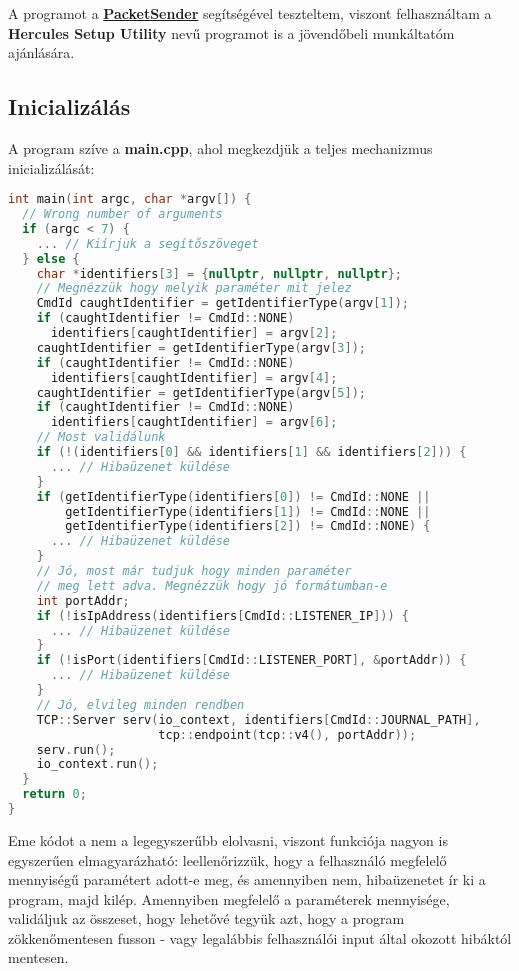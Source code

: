 \documentclass[openany,10pt,a4paper]{book}
\begin{document}
A programot a \href{https://packetsender.com/}{\textbf{PacketSender}} segítségével teszteltem, viszont felhasználtam a \textbf{Hercules Setup Utility} nevű programot is a jövendőbeli munkáltatóm ajánlására.

\subsection{Inicializálás}

A program szíve a \textbf{main.cpp}, ahol megkezdjük a teljes mechanizmus inicializálását:

\begin{lstlisting}[language=C++,caption=main.cpp distilled]
int main(int argc, char *argv[]) {
  // Wrong number of arguments
  if (argc < 7) {
    ... // Kiírjuk a segítőszöveget
  } else {
    char *identifiers[3] = {nullptr, nullptr, nullptr};
    // Megnézzük hogy melyik paraméter mit jelez
    CmdId caughtIdentifier = getIdentifierType(argv[1]);
    if (caughtIdentifier != CmdId::NONE)
      identifiers[caughtIdentifier] = argv[2];
    caughtIdentifier = getIdentifierType(argv[3]);
    if (caughtIdentifier != CmdId::NONE)
      identifiers[caughtIdentifier] = argv[4];
    caughtIdentifier = getIdentifierType(argv[5]);
    if (caughtIdentifier != CmdId::NONE)
      identifiers[caughtIdentifier] = argv[6];
    // Most validálunk
    if (!(identifiers[0] && identifiers[1] && identifiers[2])) {
      ... // Hibaüzenet küldése
    }
    if (getIdentifierType(identifiers[0]) != CmdId::NONE ||
        getIdentifierType(identifiers[1]) != CmdId::NONE ||
        getIdentifierType(identifiers[2]) != CmdId::NONE) {
      ... // Hibaüzenet küldése
    }
    // Jó, most már tudjuk hogy minden paraméter
    // meg lett adva. Megnézzük hogy jó formátumban-e
    int portAddr;
    if (!isIpAddress(identifiers[CmdId::LISTENER_IP])) {
      ... // Hibaüzenet küldése
    }
    if (!isPort(identifiers[CmdId::LISTENER_PORT], &portAddr)) {
      ... // Hibaüzenet küldése
    }
    // Jó, elvileg minden rendben
    TCP::Server serv(io_context, identifiers[CmdId::JOURNAL_PATH],
                     tcp::endpoint(tcp::v4(), portAddr));
    serv.run();
    io_context.run();
  }
  return 0;
}
\end{lstlisting}

Eme kódot a nem a legegyszerűbb elolvasni, viszont funkciója nagyon is egyszerűen elmagyarázható: leellenőrizzük, hogy a felhasználó megfelelő mennyiségű paramétert adott-e meg, és amennyiben nem, hibaüzenetet ír ki a program, majd kilép. Amennyiben megfelelő a paraméterek mennyisége, validáljuk az összeset, hogy lehetővé tegyük azt, hogy a program zökkenőmentesen fusson - vagy legalábbis felhasználói input által okozott hibáktól mentesen.
\end{document}

